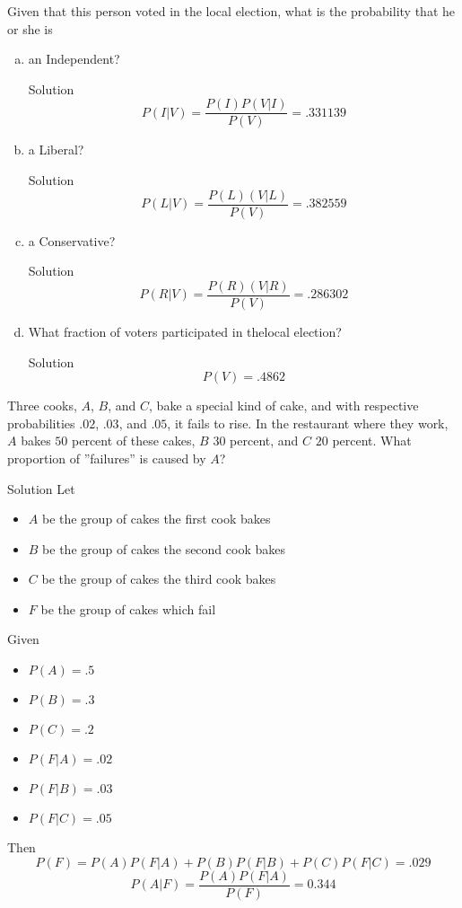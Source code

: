 \documentclass{article}
\begin{document}
\begin{spacing}{1.1}
\begin{homeworkProblem}
  Given that this person voted in the local election, what is the 
  probability that he or she is
  \begin{enumerate}[(a)]
    \item an Independent?
      \begin{homeworkSection}{Solution}
         \[P( I|V) = \frac{ P( I) P( V|I)}{ P(V)} = .331139\]
      \end{homeworkSection}
    \item a Liberal?
      \begin{homeworkSection}{Solution}
         \[P( L|V) = \frac{ P( L)( V|L)}{ P(V)} = .382559\]
      \end{homeworkSection}
    \item a Conservative?
      \begin{homeworkSection}{Solution}
         \[P( R|V) = \frac{ P( R)( V|R)}{ P(V)} = .286302\]
      \end{homeworkSection}
    \item What fraction of voters participated in thelocal election?
      \begin{homeworkSection}{Solution}
         \[P( V) = .4862\]
      \end{homeworkSection}
  \end{enumerate}
\end{homeworkProblem}
\newpage
\begin{homeworkProblem}
  Three cooks, $A$, $B$, and $C$, bake a special kind of cake, and with 
  respective probabilities $.02$, $.03$, and $.05$, it fails to rise. 
  In the restaurant where they work, $A$ bakes $50$ percent of these cakes, 
  $B$ $30$ percent, and $C$ $20$ percent. What proportion of ''failures'' 
  is caused by $A$?
  \begin{homeworkSection}{Solution}
     Let
    \begin{itemize}
      \item $A$ be the group of cakes the first cook bakes
      \item $B$ be the group of cakes the second cook bakes
      \item $C$ be the group of cakes the third cook bakes
      \item $F$ be the group of cakes which fail
    \end{itemize}
    Given
    \begin{itemize}
      \item $P( A) = .5$
      \item $P( B) = .3$
      \item $P( C) = .2$
      \item $P( F|A) = .02$
      \item $P( F|B) = .03$
      \item $P( F|C) = .05$
    \end{itemize}
    Then
      \[P( F) = P( A)P( F|A) + P( B)P( F|B) + P( C)P( F|C) = .029\]
      \[P( A|F)= \frac{ P( A)P( F|A)}{ P( F)} = 0.344\]
  \end{homeworkSection}
\end{homeworkProblem}
\end{spacing}
\end{document}
